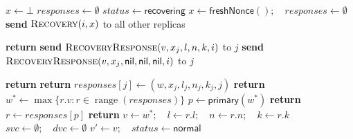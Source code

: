 \begin{algorithm}[!tb]
  \caption{Viewstamped Replication: Recovery After a Crash}
  \label{vr-recovery}
  \begin{algorithmic}[1]
    \State $x\gets\bot$
    \State $\mathit{responses}\gets\emptyset$
      \State $\mathit{status}\gets\mathsf{recovering}$
      \State $x\gets\mathsf{freshNonce}();\quad\mathit{responses}\gets\emptyset$
      \State \textbf{send} $\textsc{Recovery}(i, x)$ to all other replicas 
    \EndProcedure

        \State \textbf{return}
      \EndIf
        \State \textbf{send} $\textsc{RecoveryResponse}(v,x_j,l,n,k,i)$ to $j$
      \Else
        \State \textbf{send} $\textsc{RecoveryResponse}(v,x_j,\mathsf{nil},\mathsf{nil},\mathsf{nil},i)$ to $j$
      \EndIf
    \EndProcedure

        \State \textbf{return}
      \EndIf
        \State \textbf{return} 
      \EndIf
      \State $\mathit{responses}[j]\gets(w,x_j,l_j,n_j,k_j,j)$
        \State \textbf{return}
      \EndIf
      \State $w^*\gets\max\{r.v:r\in\operatorname{range}(\mathit{responses})\}$ 
      \State $p\gets\mathsf{primary}(w^*)$
        \State \textbf{return}
      \EndIf
      \State $r\gets\mathit{responses}[p]$
        \State \textbf{return}
      \EndIf
      \State $v\gets w^*;\quad l\gets r.l;\quad n\gets r.n;\quad k\gets r.k$
      \State $\mathit{svc}\gets\emptyset;\quad\mathit{dvc}\gets\emptyset$
      \State $v'\gets v;\quad\mathit{status}\gets\mathsf{normal}$
    \EndProcedure
  \end{algorithmic}
\end{algorithm}
